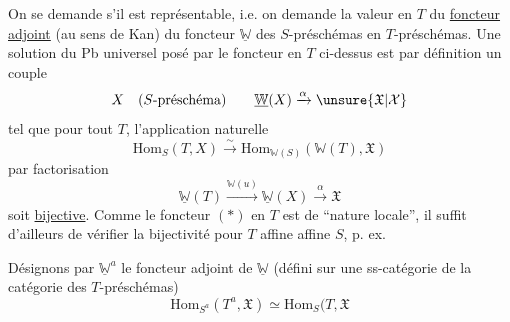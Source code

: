 On  se demande s'il est représentable, i.e. on demande la valeur en $T$ du \uline{foncteur adjoint} (au sens de Kan) du foncteur $\underline{\mathbb W}$ des $S$-préschémas en $T$-préschémas. Une solution du Pb universel posé par le foncteur en $T$ ci-dessus est par définition un couple
\[
 X\quad(S\text{-préschéma})\qquad \underline{\mathbb W}(X)\xrightarrow{\alpha}\unsure{\mathfrak X|\mathcal X}
\]
tel que pour tout $T$, l'application naturelle
\[
 \mathrm{Hom}_S(T,X)\xrightarrow{\sim}\mathrm{Hom}_{\mathbb W(S)}(\mathbb W(T),\mathfrak X)
\]
  par factorisation
\[
 \underline{\mathbb W}(T)\xrightarrow{\mathbb W(u)}\underline{\mathbb W}(X)\xrightarrow{\alpha}\mathfrak X
\]
soit \uline{bijective}. Comme le foncteur $(*)$ en $T$ est de ``nature locale'', il suffit d'ailleurs de vérifier la bijectivité pour $T$ affine   affine  $S$, p. ex.

Désignons par $\underline{\mathbb W}^a$ le foncteur adjoint de $\underline{\mathbb W}$ (défini sur une ss-catégorie de la catégorie des $T$-préschémas)
\[
 \mathrm{Hom}_{S^a}(T^a,\mathfrak X)\simeq\mathrm{Hom}_S(T,\mathfrak X
\]
